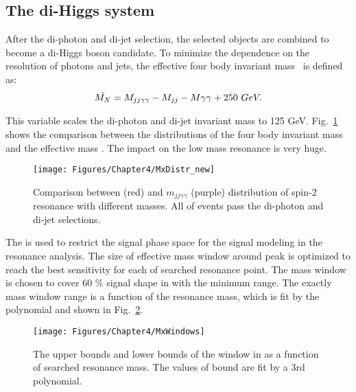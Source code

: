 \subsection{The di-Higgs system} \label{ssec:diHiggsSelection}

After the di-photon and di-jet selection, the selected objects are combined to become a di-Higgs boson candidate.
To minimize the dependence on the resolution of photons and jets, the effective four body invariant mass~\cite{1404.0996} is defined as:
\begin{equation} \label{eq:MxDef}
  \begin{aligned}
	\tilde{M_{X}}=M_{jj\gamma\gamma}-M_{jj}-M{\gamma\gamma}+250~GeV.
  \end{aligned}
\end{equation}

This variable scales the di-photon and di-jet invariant mass to 125 GeV.
Fig.~\ref{fig:MxDistr} shows the comparison between the distributions of the four body invariant mass and the effective mass \Mx.
The impact on the low mass resonance is very huge.

\begin{figure}[h]
  \centering
  \texttt{[image: Figures/Chapter4/MxDistr\_new]}
  \caption{Comparison between \Mx (red) and $m_{jj\gamma\gamma}$ (purple) distribution of spin-2 resonance with different masses.
  All of events pass the di-photon and di-jet selections.}
  \label{fig:MxDistr}
\end{figure}

The \Mx is used to restrict the signal phase space for the signal modeling in the resonance analysis.
The size of effective mass window around \Mx peak is optimized to reach the best sensitivity for each of searched resonance point.
The mass window is chosen to cover 60 \% signal shape in \Mx with the minimum range.
The exactly mass window range is a function of the resonance mass, which is fit by the polynomial and shown in Fig.~\ref{fig:MxWindows}.

\begin{figure}[h]
  \centering
  \texttt{[image: Figures/Chapter4/MxWindows]}
  \caption{The upper bounds and lower bounds of the window in \Mx as a function of searched resonance mass.
  The values of bound are fit by a 3rd polynomial.}
  \label{fig:MxWindows}
\end{figure}

